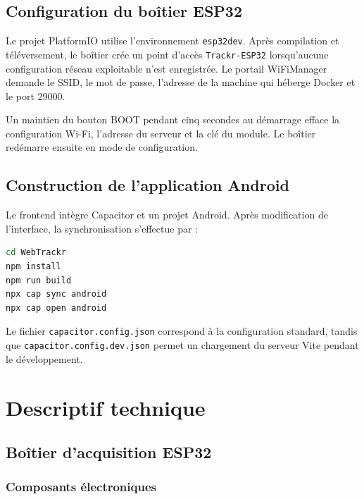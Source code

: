 \documentclass[11pt,a4paper]{article}
\newcommand{\code}[1]{\nolinkurl{#1}}
\begin{document}
\subsection{Configuration du boîtier ESP32}

Le projet PlatformIO utilise l'environnement \code{esp32dev}. Après compilation et téléversement, le boîtier crée un point d'accès \code{Trackr-ESP32} lorsqu'aucune configuration réseau exploitable n'est enregistrée. Le portail WiFiManager demande le SSID, le mot de passe, l'adresse de la machine qui héberge Docker et le port 29000.

Un maintien du bouton BOOT pendant cinq secondes au démarrage efface la configuration Wi-Fi, l'adresse du serveur et la clé du module. Le boîtier redémarre ensuite en mode de configuration.

\subsection{Construction de l'application Android}

Le frontend intègre Capacitor et un projet Android. Après modification de l'interface, la synchronisation s'effectue par :

\begin{lstlisting}[language=bash]
cd WebTrackr
npm install
npm run build
npx cap sync android
npx cap open android
\end{lstlisting}

Le fichier \code{capacitor.config.json} correspond à la configuration standard, tandis que \code{capacitor.config.dev.json} permet un chargement du serveur Vite pendant le développement.

\clearpage
\section{Descriptif technique}
\label{sec:descriptif}

\subsection{Boîtier d'acquisition ESP32}

\subsubsection{Composants électroniques}
\end{document}
